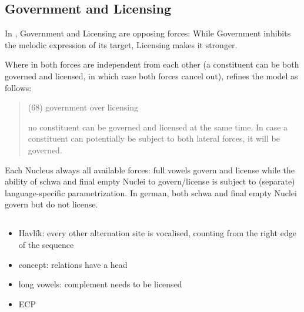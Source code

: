 \subsection{Government and Licensing}
\label{subsec:intro:gov lic}

In \CVCV, Government and Licensing are opposing forces:
While Government inhibits the melodic expression of
its target, Licensing makes it stronger.

Where in \cite{scheer2004} both forces are independent
from each other (a constituent can be both governed
and licensed, in which case both forces cancel out),
\cite{scheer2012} refines the model as follows:
\blockquote[\cite{scheer2012}]{
  (68) government over licensing
  
  no constituent can be governed and licensed at the
  same time. In case a constituent can potentially be
  subject to both lateral forces, it will be governed.
}

Each Nucleus always 
all available forces: full vowels govern and license
while the ability of schwa and final empty Nuclei to
govern/license is subject to (separate) language-specific
parametrization.
In german, both schwa and final empty Nuclei govern but
do not license.


\subsection[TODO]{\TODO{}}
\begin{itemize}\color{red}
  \item Havlík: every other alternation site is vocalised,
    counting from the right edge of the sequence\par
  \item concept: relations have a head
  \item long vowels: complement needs to be licensed
  \item \gls{ECP}
\end{itemize}